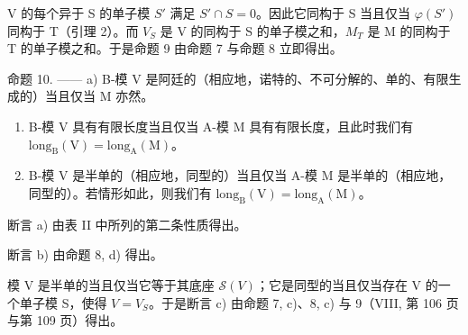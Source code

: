 V 的每个异于 S 的单子模 \(S'\) 满足 \(S' \cap S = 0\)。因此它同构于 S 当且仅当 \(\varphi(S')\) 同构于 T（引理 2）。而 \(V_{S}\) 是 V 的同构于 S 的单子模之和，\(M_{T}\) 是 M 的同构于 T 的单子模之和。于是命题 9 由命题 7 与命题 8 立即得出。

命题 10. —— a) B-模 V 是阿廷的（相应地，诺特的、不可分解的、单的、有限生成的）当且仅当 M 亦然。

\begin{enumerate}
\def\labelenumi{\alph{enumi})}
\setcounter{enumi}{1}
\item
  B-模 V 具有有限长度当且仅当 A-模 M 具有有限长度，且此时我们有 \(\mathrm{long}_{\mathrm{B}}(\mathrm{V}) = \mathrm{long}_{\mathrm{A}}(\mathrm{M})\)。
\item
  B-模 V 是半单的（相应地，同型的）当且仅当 A-模 M 是半单的（相应地，同型的）。若情形如此，则我们有 \(\text{long}_{\text{B}}(\text{V}) = \text{long}_{\text{A}}(\text{M})\)。
\end{enumerate}

断言 a) 由表 II 中所列的第二条性质得出。

断言 b) 由命题 8, d) 得出。

模 V 是半单的当且仅当它等于其底座 \(\mathcal{S}(V)\)；它是同型的当且仅当存在 V 的一个单子模 S，使得 \(V = V_{S}\)。于是断言 c) 由命题 7, c)、8, c) 与 9（VIII, 第 106 页与第 109 页）得出。

